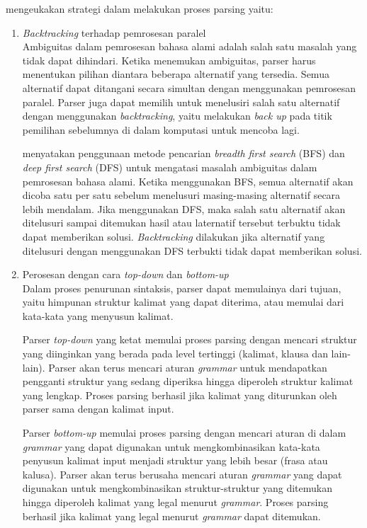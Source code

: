 \citet{bar_feigenbaum} mengeukakan strategi dalam melakukan proses parsing yaitu:
\begin{enumerate}
	\item \emph{Backtracking} terhadap pemrosesan paralel\\
	Ambiguitas dalam pemrosesan bahasa alami adalah salah satu masalah yang tidak dapat dihindari. Ketika menemukan ambiguitas, parser harus menentukan pilihan diantara beberapa alternatif yang tersedia. Semua alternatif dapat ditangani secara simultan dengan menggunakan pemrosesan paralel. Parser juga dapat memilih untuk menelusiri salah satu alternatif dengan menggunakan \emph{backtracking}, yaitu melakukan \emph{back up} pada titik pemilihan sebelumnya di dalam komputasi untuk mencoba lagi.

	\citet{gazdar_mellish} menyatakan penggunaan metode pencarian \emph{breadth first search} (BFS) dan \emph{deep first search} (DFS) untuk mengatasi masalah ambiguitas dalam pemrosesan bahasa alami. Ketika menggunakan BFS, semua alternatif akan dicoba satu per satu sebelum menelusuri masing-masing alternatif secara lebih mendalam. Jika menggunakan DFS, maka salah satu alternatif akan ditelusuri sampai ditemukan hasil atau laternatif tersebut terbuktu tidak dapat memberikan solusi. \emph{Backtracking} dilakukan jika alternatif yang ditelusuri dengan menggunakan DFS terbukti tidak dapat memberikan solusi.

	\item Perosesan dengan cara \emph{top-down} dan \emph{bottom-up}\\
	Dalam proses penurunan sintaksis, parser dapat memulainya dari tujuan, yaitu himpunan struktur kalimat yang dapat diterima, atau memulai dari kata-kata yang menyusun kalimat.

	Parser \emph{top-down} yang ketat memulai proses parsing dengan mencari struktur yang diinginkan yang berada pada level tertinggi (kalimat, klausa dan lain-lain). Parser akan terus mencari aturan \emph{grammar} untuk mendapatkan pengganti struktur yang sedang diperiksa hingga diperoleh struktur kalimat yang lengkap. Proses parsing berhasil jika kalimat yang diturunkan oleh parser sama dengan kalimat input.

	Parser \emph{bottom-up} memulai proses parsing dengan mencari aturan di dalam \emph{grammar} yang dapat digunakan untuk mengkombinasikan kata-kata penyusun kalimat input menjadi struktur yang lebih besar (frasa atau kalusa). Parser akan terus berusaha mencari aturan \emph{grammar} yang dapat digunakan untuk mengkombinasikan struktur-struktur yang ditemukan hingga diperoleh kalimat yang legal menurut \emph{grammar}. Proses parsing berhasil jika kalimat yang legal menurut \emph{grammar} dapat ditemukan.


\end{enumerate}
